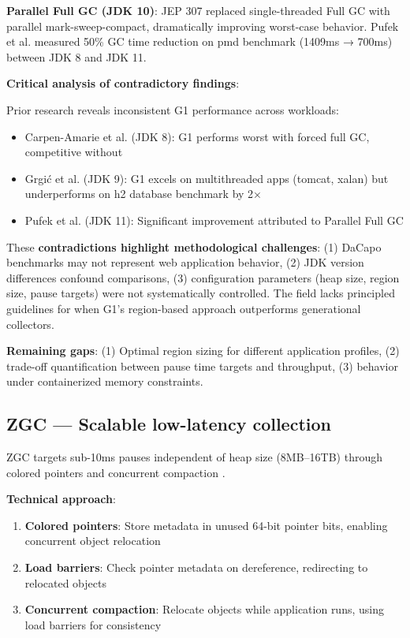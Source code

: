 \textbf{Parallel Full GC (JDK 10)}: JEP 307 \cite{jep307} replaced single-threaded Full GC with parallel mark-sweep-compact, dramatically improving worst-case behavior. Pufek et al. \cite{pufek2019analysis} measured 50\% GC time reduction on pmd benchmark (1409ms → 700ms) between JDK 8 and JDK 11.

\textbf{Critical analysis of contradictory findings}:

Prior research reveals inconsistent G1 performance across workloads:

\begin{itemize}
    \item Carpen-Amarie et al. \cite{carpen2015performance} (JDK 8): G1 performs worst with forced full GC, competitive without
    \item Grgić et al. \cite{grgic2018comparison} (JDK 9): G1 excels on multithreaded apps (tomcat, xalan) but underperforms on h2 database benchmark by 2×
    \item Pufek et al. \cite{pufek2019analysis} (JDK 11): Significant improvement attributed to Parallel Full GC
\end{itemize}

These \textbf{contradictions highlight methodological challenges}: (1) DaCapo benchmarks may not represent web application behavior, (2) JDK version differences confound comparisons, (3) configuration parameters (heap size, region size, pause targets) were not systematically controlled. The field lacks principled guidelines for when G1's region-based approach outperforms generational collectors.

\textbf{Remaining gaps}: (1) Optimal region sizing for different application profiles, (2) trade-off quantification between pause time targets and throughput, (3) behavior under containerized memory constraints.

\subsection{ZGC --- Scalable low-latency collection}
\label{subsec:zgc}

ZGC targets sub-10ms pauses independent of heap size (8MB--16TB) through colored pointers and concurrent compaction \cite{jep333, oracle2023gc}.

\textbf{Technical approach}:
\begin{enumerate}
    \item \textbf{Colored pointers}: Store metadata in unused 64-bit pointer bits, enabling concurrent object relocation
    \item \textbf{Load barriers}: Check pointer metadata on dereference, redirecting to relocated objects
    \item \textbf{Concurrent compaction}: Relocate objects while application runs, using load barriers for consistency
\end{enumerate}

